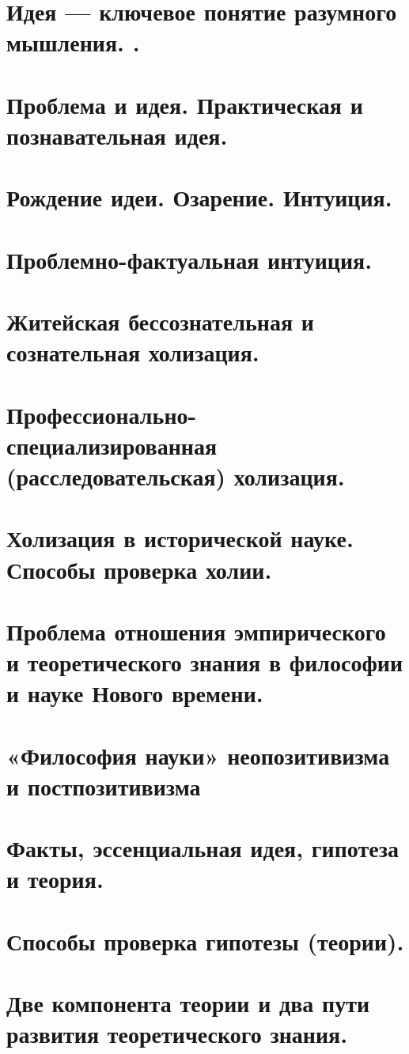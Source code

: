 \section{ Идея — ключевое понятие разумного мышления. .}
\section{ Проблема и идея. Практическая и познавательная идея.}
\section{ Рождение идеи. Озарение. Интуиция.}
\section{ Проблемно-фактуальная интуиция.}
\section{ Житейская бессознательная и сознательная холизация. }
\section{ Профессионально-специализированная (расследовательская) холизация.}
\section{ Холизация в исторической науке. Способы проверка холии.}
\section{ Проблема отношения эмпирического и теоретического знания в философии и науке Нового времени.}
\section{ «Философия науки» неопозитивизма и постпозитивизма }
\section{ Факты, эссенциальная идея, гипотеза и теория.}
\section{ Способы проверка гипотезы (теории).}
\section{ Две компонента теории и два пути развития теоретического знания.}
